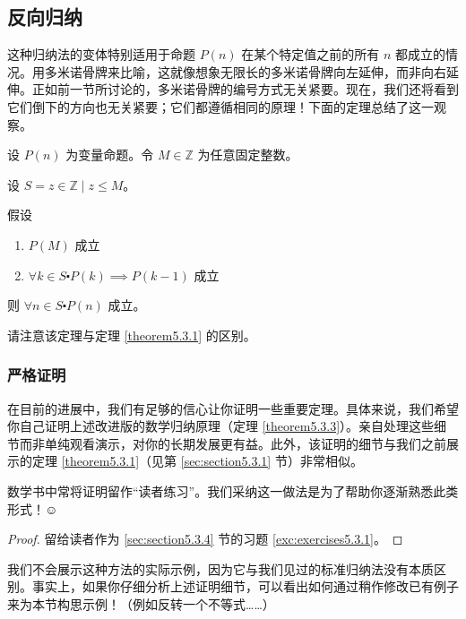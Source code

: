 \subsection{反向归纳}

这种归纳法的变体特别适用于命题 $P(n)$ 在某个特定值之前的所有 $n$ 都成立的情况。用多米诺骨牌来比喻，这就像想象无限长的多米诺骨牌向左延伸，而非向右延伸。正如前一节所讨论的，多米诺骨牌的编号方式无关紧要。现在，我们还将看到它们倒下的方向也无关紧要；它们都遵循相同的原理！下面的定理总结了这一观察。

\begin{theorem}[反向归纳]\label{theorem5.3.3}
    设 $P(n)$ 为变量命题。令 $M \in \mathbb{Z}$ 为任意固定整数。

    设 $S = {z \in \mathbb{Z} \mid z \le M}$。

    假设
    \begin{enumerate}[label=(\arabic*)]
        \item $P(M)$ 成立
        \item $\forall k \in S \centerdot P(k) \implies P(k - 1)$ 成立
    \end{enumerate}

    则 $\forall n \in S \centerdot P(n)$ 成立。
\end{theorem}

请注意该定理与定理 \ref{theorem5.3.1} 的区别。

\subsubsection*{严格证明}

在目前的进展中，我们有足够的信心让你证明一些重要定理。具体来说，我们希望你自己证明上述改进版的数学归纳原理（定理 \ref{theorem5.3.3}）。亲自处理这些细节而非单纯观看演示，对你的长期发展更有益。此外，该证明的细节与我们之前展示的定理 \ref{theorem5.3.1}（见第 \ref{sec:section5.3.1} 节）非常相似。

数学书中常将证明留作``读者练习''。我们采纳这一做法是为了帮助你逐渐熟悉此类形式！$\smiley{}$

\begin{proof}
    留给读者作为 \ref{sec:section5.3.4} 节的习题 \ref{exc:exercises5.3.1}。
\end{proof}

我们不会展示这种方法的实际示例，因为它与我们见过的标准归纳法没有本质区别。事实上，如果你仔细分析上述证明细节，可以看出如何通过稍作修改已有例子来为本节构思示例！（例如反转一个不等式……）

